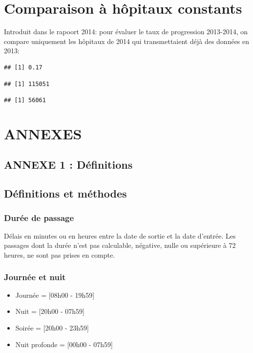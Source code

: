 \documentclass[]{article}
\begin{document}
\section{Comparaison à hôpitaux
constants}\label{comparaison-a-hopitaux-constants}

Introduit dans le rapoort 2014: pour évaluer le taux de progression
2013-2014, on compare uniquement les hôpitaux de 2014 qui transmettaient
déjà des données en 2013:

\begin{verbatim}
## [1] 0.17
\end{verbatim}

\begin{verbatim}
## [1] 115051
\end{verbatim}

\begin{verbatim}
## [1] 56061
\end{verbatim}

\section{ANNEXES}\label{annexes}

\subsection{ANNEXE 1 : Définitions}\label{annexe-1-definitions}

\subsection{Définitions et méthodes}\label{definitions-et-methodes}

\subsubsection{Durée de passage}\label{duree-de-passage-1}

Délais en minutes ou en heures entre la date de sortie et la date
d'entrée. Les passages dont la durée n'est pas calculable, négative,
nulle ou supérieure à 72 heures, ne sont pas prises en compte.

\subsubsection{Journée et nuit}\label{journee-et-nuit}

\begin{itemize}
\itemsep1pt\parskip0pt
\item
  Journée = {[}08h00 - 19h59{]}
\item
  Nuit = {[}20h00 - 07h59{]}
\item
  Soirée = {[}20h00 - 23h59{]}
\item
  Nuit profonde = {[}00h00 - 07h59{]}
\end{itemize}
\end{document}

